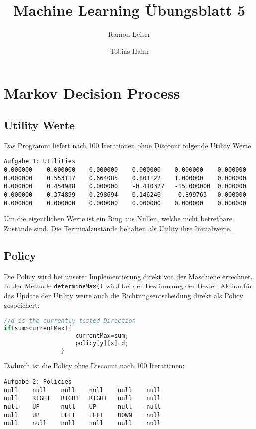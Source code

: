 \documentclass[a4paper]{article}
\title{Machine Learning Übungsblatt 5}
\author{Ramon Leiser\and Tobias Hahn}
\begin{document}
\maketitle
\newpage


\section{Markov Decision Process}
\lstset{numbers=none}
\subsection{Utility Werte}
Das Programm liefert nach 100 Iterationen ohne Discount folgende Utility Werte
\begin{lstlisting}
Aufgabe 1: Utilities
0.000000 	0.000000 	0.000000 	0.000000 	0.000000 	0.000000 	
0.000000 	0.553117 	0.664085 	0.801122 	1.000000 	0.000000 	
0.000000 	0.454988 	0.000000 	-0.410327 	-15.000000 	0.000000 	
0.000000 	0.374899 	0.298694 	0.146246 	-0.899763 	0.000000 	
0.000000 	0.000000 	0.000000 	0.000000 	0.000000 	0.000000 	
\end{lstlisting}
Um die eigentlichen Werte ist ein Ring aus Nullen, welche nicht betretbare Zustände sind. Die Terminalzustände behalten als Utility ihre Initialwerte.
\subsection{Policy}
Die Policy wird bei unserer Implementierung direkt von der Maschiene errechnet. In der Methode \texttt{determineMax()} wird bei der Bestimmung der Besten Aktion für das Update der Utility werte auch die Richtungsentscheidung direkt als Policy gespeichert:
\begin{lstlisting}[language=Java]
//d is the currently tested Direction
if(sum>currentMax){
					currentMax=sum;
					policy[y][x]=d;
				}
\end{lstlisting}
Dadurch ist die Policy ohne Discount nach 100 Iterationen:
\begin{lstlisting}
Aufgabe 2: Policies
null	null	null	null	null	null	
null	RIGHT	RIGHT	RIGHT	null	null	
null	UP		null	UP		null	null	
null	UP		LEFT	LEFT	DOWN	null	
null	null	null	null	null	null	
\end{lstlisting}
\end{document}
